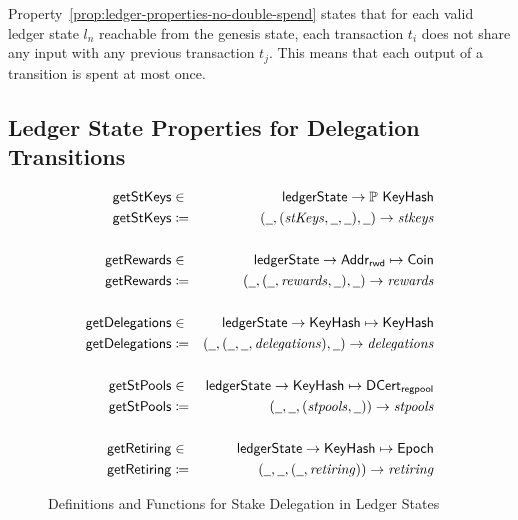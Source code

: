 Property~\ref{prop:ledger-properties-no-double-spend} states that for each valid
ledger state $l_{n}$ reachable from the genesis state, each transaction $t_{i}$
does not share any input with any previous transaction $t_{j}$. This means that
each output of a transition is spent at most once.

\subsection{Ledger State Properties for Delegation Transitions}
\label{sec:ledg-prop-deleg}

\begin{figure}[ht]
  \centering
  \begin{align*}
    \fun{getStKeys} & \in & \ledgerState \to \powerset \KeyHash \\
    \fun{getStKeys} & \coloneqq & (\wcard, (\var{stKeys}, \wcard, \wcard),
                                  \wcard) \to \var{stkeys} \\
                    &&\\
    \fun{getRewards} & \in & \ledgerState \to \AddrRWD \mapsto \Coin \\
    \fun{getRewards} & \coloneqq & (\wcard, (\wcard, \var{rewards}, \wcard),
                                   \wcard) \to \var{rewards} \\
                    &&\\
    \fun{getDelegations} & \in & \ledgerState \to \KeyHash \mapsto \KeyHash \\
    \fun{getDelegations} & \coloneqq & (\wcard, (\wcard, \wcard,
                                       \var{delegations}), \wcard) \to
                                       \var{delegations} \\
                    &&\\
    \fun{getStPools} & \in & \ledgerState \to \KeyHash \mapsto \DCertRegPool \\
    \fun{getStPools} & \coloneqq & (\wcard, \wcard,
                                   (\var{stpools}, \wcard)) \to \var{stpools} \\
                    &&\\
    \fun{getRetiring} & \in & \ledgerState \to \KeyHash \mapsto \Epoch \\
    \fun{getRetiring} & \coloneqq & (\wcard, \wcard,
                                    (\wcard, \var{retiring})) \to \var{retiring} \\
  \end{align*}
  \caption{Definitions and Functions for Stake Delegation in Ledger States}
  \label{fig:stake-delegation-functions}
\end{figure}


